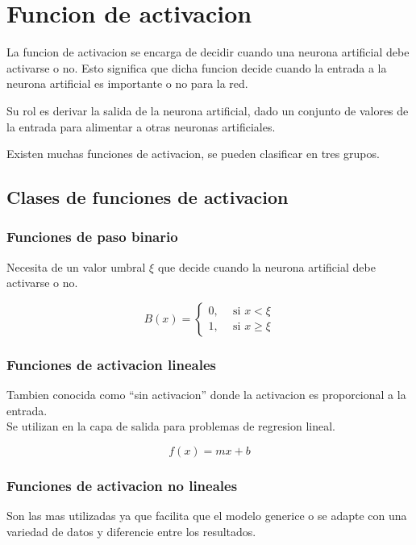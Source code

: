 \documentclass[runningheads]{llncs} %
\begin{document}
\section{Funcion de activacion}
La funcion de activacion se encarga de decidir cuando una neurona artificial debe activarse
o no. Esto significa que dicha funcion decide cuando la entrada a la neurona artificial
es importante o no para la red. \cite{fun-activacion}

Su rol es derivar la salida de la neurona artificial, dado un conjunto de valores de la entrada
para alimentar a otras neuronas artificiales. \cite{fun-activacion}

Existen muchas funciones de activacion, se pueden clasificar en tres grupos.
\subsection{Clases de funciones de activacion}

\subsubsection{Funciones de paso binario}
Necesita de un valor umbral \(\xi\) que decide cuando la neurona artificial debe activarse o no.
\cite{fun-activacion}

\[
    B(x) =
    \left \{
        \begin{aligned}
        0, \ \ & \text{si } x < \xi  \\
        1, \ \ & \text{si } x \geq \xi
        \end{aligned}
    \right .
\]

\subsubsection{Funciones de activacion lineales}
Tambien conocida como \textquotedblleft{}sin activacion\textquotedblright{} 
donde la activacion es proporcional a la entrada. \cite{fun-activacion2} \\
Se utilizan en la capa de salida para problemas de regresion lineal. \cite{fun-activacion}

\[ f(x)=mx+b \]

\subsubsection{Funciones de activacion no lineales}
Son las mas utilizadas ya que facilita que el modelo generice o se adapte con una 
variedad de datos y diferencie entre los resultados. \cite{fun-activacion2}
\end{document}
